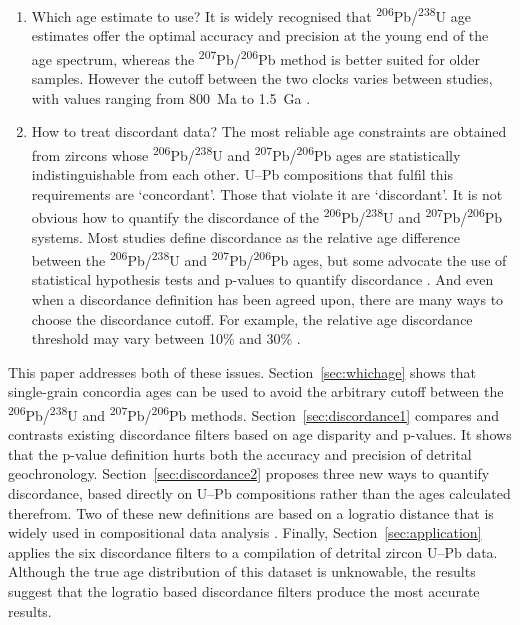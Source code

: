 \documentclass[gchron, manuscript]{copernicus}
\begin{document}
\begin{enumerate}
\item Which age estimate to use? It is widely recognised that
  \textsuperscript{206}Pb/\textsuperscript{238}U age estimates offer
  the optimal accuracy and precision at the young end of the age
  spectrum, whereas the
  \textsuperscript{207}Pb/\textsuperscript{206}Pb method is better
  suited for older samples. However the cutoff between the two clocks
  varies between studies, with values ranging from 800~Ma to 1.5~Ga
  \citep{gehrels2011,spencer2016}.
\item How to treat discordant data? The most reliable age constraints
  are obtained from zircons whose
  \textsuperscript{206}Pb/\textsuperscript{238}U and
  \textsuperscript{207}Pb/\textsuperscript{206}Pb ages are
  statistically indistinguishable from each other. U--Pb compositions
  that fulfil this requirements are `concordant'. Those that violate
  it are `discordant'. It is not obvious how to quantify the
  discordance of the \textsuperscript{206}Pb/\textsuperscript{238}U
  and \textsuperscript{207}Pb/\textsuperscript{206}Pb systems. Most
  studies define discordance as the relative age difference between
  the \textsuperscript{206}Pb/\textsuperscript{238}U and
  \textsuperscript{207}Pb/\textsuperscript{206}Pb ages, but some
  advocate the use of statistical hypothesis tests and p-values to
  quantify discordance \citep{spencer2016}. And even when a
  discordance definition has been agreed upon, there are many ways to
  choose the discordance cutoff. For example, the relative age
  discordance threshold may vary between 10\% and 30\%
  \citep{gehrels2011}.
\end{enumerate}

This paper addresses both of these issues. Section~\ref{sec:whichage}
shows that single-grain concordia ages \citep{ludwig1998} can be used
to avoid the arbitrary cutoff between the
\textsuperscript{206}Pb/\textsuperscript{238}U and
\textsuperscript{207}Pb/\textsuperscript{206}Pb
methods. Section~\ref{sec:discordance1} compares and contrasts
existing discordance filters based on age disparity and p-values. It
shows that the p-value definition hurts both the accuracy and
precision of detrital geochronology. Section~\ref{sec:discordance2}
proposes three new ways to quantify discordance, based directly on
U--Pb compositions rather than the ages calculated therefrom. Two of
these new definitions are based on a logratio distance that is widely
used in compositional data analysis \citep{aitchison1986}. Finally,
Section~\ref{sec:application} applies the six discordance filters to a
compilation of detrital zircon U--Pb data. Although the true age
distribution of this dataset is unknowable, the results suggest that
the logratio based discordance filters produce the most accurate
results.
\end{document}
